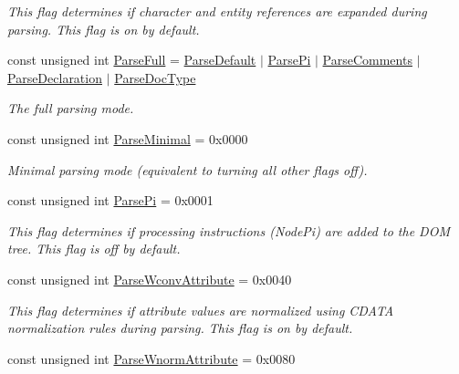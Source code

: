 \begin{DoxyCompactItemize}
\begin{DoxyCompactList}\small\item\em This flag determines if character and entity references are expanded during parsing. This flag is on by default. \item\end{DoxyCompactList}\item 
const unsigned int \hyperlink{namespacephys_1_1xml_af1c356f1eb063a63efebd6c8a5241c63}{ParseFull} = \hyperlink{namespacephys_1_1xml_aa6b8f7f8c2322fd683a235b498834d60}{ParseDefault} $|$ \hyperlink{namespacephys_1_1xml_a4d324954fc33d50155bae04587da13e2}{ParsePi} $|$ \hyperlink{namespacephys_1_1xml_a83ba30a7bee5a0fd4aa2f6136c8793fc}{ParseComments} $|$ \hyperlink{namespacephys_1_1xml_a463f15fc43d69ab835c8598826f65646}{ParseDeclaration} $|$ \hyperlink{namespacephys_1_1xml_adf5ee79dc4c200ad85b64a8308b0c805}{ParseDocType}
\begin{DoxyCompactList}\small\item\em The full parsing mode. \item\end{DoxyCompactList}\item 
const unsigned int \hyperlink{namespacephys_1_1xml_ab660837afbc6aaab22425d8d23e8f2e4}{ParseMinimal} = 0x0000
\begin{DoxyCompactList}\small\item\em Minimal parsing mode (equivalent to turning all other flags off). \item\end{DoxyCompactList}\item 
\hypertarget{namespacephys_1_1xml_a4d324954fc33d50155bae04587da13e2}{
const unsigned int \hyperlink{namespacephys_1_1xml_a4d324954fc33d50155bae04587da13e2}{ParsePi} = 0x0001}
\label{namespacephys_1_1xml_a4d324954fc33d50155bae04587da13e2}

\begin{DoxyCompactList}\small\item\em This flag determines if processing instructions (NodePi) are added to the DOM tree. This flag is off by default. \item\end{DoxyCompactList}\item 
\hypertarget{namespacephys_1_1xml_af9f7575e3cb8a0d8ad9a7ceee5e26983}{
const unsigned int \hyperlink{namespacephys_1_1xml_af9f7575e3cb8a0d8ad9a7ceee5e26983}{ParseWconvAttribute} = 0x0040}
\label{namespacephys_1_1xml_af9f7575e3cb8a0d8ad9a7ceee5e26983}

\begin{DoxyCompactList}\small\item\em This flag determines if attribute values are normalized using CDATA normalization rules during parsing. This flag is on by default. \item\end{DoxyCompactList}\item 
\hypertarget{namespacephys_1_1xml_acddcc88320f06c933c67cdd77704c838}{
const unsigned int \hyperlink{namespacephys_1_1xml_acddcc88320f06c933c67cdd77704c838}{ParseWnormAttribute} = 0x0080}
\label{namespacephys_1_1xml_acddcc88320f06c933c67cdd77704c838}


\end{DoxyCompactItemize}
